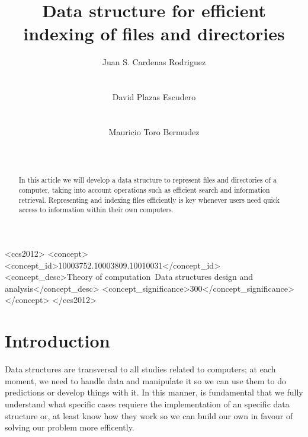 \documentclass{sig-alternate-05-2015}
\begin{document}
  \doi{}
  \isbn{}

  \title{Data structure for efficient indexing of files and directories}


  \author{
    \alignauthor
    Juan S. Cardenas Rodriguez\\
           \\
           \\
    \alignauthor
    David Plazas Escudero\\
           \\
           \\
    \alignauthor
    Mauricio Toro Bermudez\\
           \\
           \\
  }

\begin{CCSXML}
<ccs2012>
<concept>
<concept_id>10003752.10003809.10010031</concept_id>
<concept_desc>Theory of computation~Data structures design and analysis</concept_desc>
<concept_significance>300</concept_significance>
</concept>
</ccs2012>
\end{CCSXML}

  \maketitle

  \begin{abstract}
    In this article we will develop a data structure to represent files and directories of a computer,
    taking into account operations such as efficient search and information retrieval. Representing and
    indexing files efficiently is key whenever users need quick access to information within
    their own computers.
  \end{abstract}

  \printccsdesc

  \section{Introduction}
    Data structures are transversal to all studies related to computers; at each moment, we need to handle
    data and manipulate it so we can use them to do predictions or develop things with it. In this manner, is fundamental
    that we fully understand what specific cases requiere the implementation of an specific data structure or,
    at least know how they work so we can build our own in favour of solving our problem more efficently.
\end{document}
